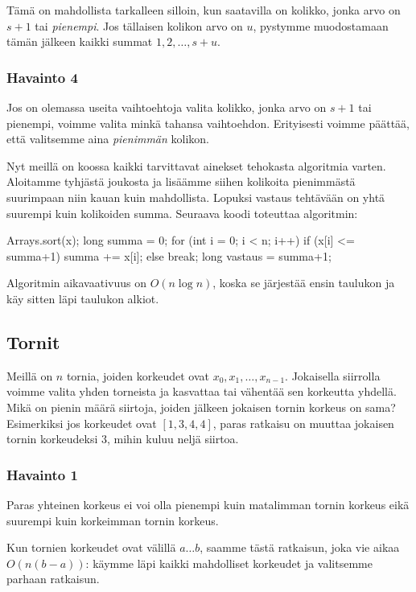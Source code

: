 Tämä on mahdollista tarkalleen silloin, kun saatavilla on kolikko,
jonka arvo on $s+1$ tai \emph{pienempi}.
Jos tällaisen kolikon arvo on $u$, pystymme muodostamaan tämän jälkeen
kaikki summat $1,2,\dots,s+u$.

\subsubsection{Havainto 4}

Jos on olemassa useita vaihtoehtoja valita kolikko,
jonka arvo on $s+1$ tai pienempi,
voimme valita minkä tahansa vaihtoehdon.
Erityisesti voimme päättää, että valitsemme aina
\emph{pienimmän} kolikon.

Nyt meillä on koossa kaikki tarvittavat ainekset
tehokasta algoritmia varten.
Aloitamme tyhjästä joukosta ja lisäämme siihen kolikoita
pienimmästä suurimpaan niin kauan kuin mahdollista.
Lopuksi vastaus tehtävään on yhtä suurempi kuin kolikoiden
summa.
Seuraava koodi toteuttaa algoritmin:

\begin{code}
Arrays.sort(x);
long summa = 0;
for (int i = 0; i < n; i++) {
    if (x[i] <= summa+1) {
        summa += x[i];
    } else {
        break;
    }
}
long vastaus = summa+1;
\end{code}

Algoritmin aikavaativuus on $O(n \log n)$, koska se
järjestää ensin taulukon ja käy sitten läpi taulukon alkiot.

\subsection{Tornit}

Meillä on $n$ tornia, joiden korkeudet ovat $x_0,x_1,\dots,x_{n-1}$.
Jokaisella siirrolla voimme valita yhden torneista ja
kasvattaa tai vähentää sen korkeutta yhdellä.
Mikä on pienin määrä siirtoja, joiden jälkeen jokaisen
tornin korkeus on sama?
Esimerkiksi jos korkeudet ovat $[1,3,4,4]$,
paras ratkaisu on muuttaa jokaisen tornin korkeudeksi $3$,
mihin kuluu neljä siirtoa.

\subsubsection{Havainto 1}

Paras yhteinen korkeus ei voi olla
pienempi kuin matalimman tornin korkeus eikä
suurempi kuin korkeimman tornin korkeus.

Kun tornien korkeudet ovat välillä $a \dots b$,
saamme tästä ratkaisun, joka vie aikaa $O(n (b-a))$:
käymme läpi kaikki mahdolliset korkeudet ja valitsemme
parhaan ratkaisun.

